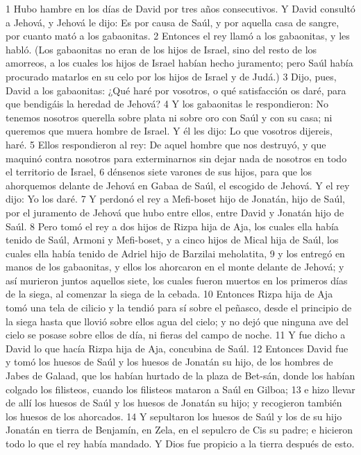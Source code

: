 1 Hubo hambre en los días de David por tres años consecutivos. Y David consultó a Jehová, y Jehová le dijo: Es por causa de Saúl, y por aquella casa de sangre, por cuanto mató a los gabaonitas.
2 Entonces el rey llamó a los gabaonitas, y les habló. (Los gabaonitas no eran de los hijos de Israel, sino del resto de los amorreos, a los cuales los hijos de Israel habían hecho juramento; pero Saúl había procurado matarlos en su celo por los hijos de Israel y de Judá.)
3 Dijo, pues, David a los gabaonitas: ¿Qué haré por vosotros, o qué satisfacción os daré, para que bendigáis la heredad de Jehová?
4 Y los gabaonitas le respondieron: No tenemos nosotros querella sobre plata ni sobre oro con Saúl y con su casa; ni queremos que muera hombre de Israel. Y él les dijo: Lo que vosotros dijereis, haré.
5 Ellos respondieron al rey: De aquel hombre que nos destruyó, y que maquinó contra nosotros para exterminarnos sin dejar nada de nosotros en todo el territorio de Israel,
6 dénsenos siete varones de sus hijos, para que los ahorquemos delante de Jehová en Gabaa de Saúl, el escogido de Jehová. Y el rey dijo: Yo los daré.
7 Y perdonó el rey a Mefi-boset hijo de Jonatán, hijo de Saúl, por el juramento de Jehová que hubo entre ellos, entre David y Jonatán hijo de Saúl. 
8 Pero tomó el rey a dos hijos de Rizpa hija de Aja, los cuales ella había tenido de Saúl, Armoni y Mefi-boset, y a cinco hijos de Mical hija de Saúl, los cuales ella había tenido de Adriel hijo de Barzilai meholatita, 
9 y los entregó en manos de los gabaonitas, y ellos los ahorcaron en el monte delante de Jehová; y así murieron juntos aquellos siete, los cuales fueron muertos en los primeros días de la siega, al comenzar la siega de la cebada.
10 Entonces Rizpa hija de Aja tomó una tela de cilicio y la tendió para sí sobre el peñasco, desde el principio de la siega hasta que llovió sobre ellos agua del cielo; y no dejó que ninguna ave del cielo se posase sobre ellos de día, ni fieras del campo de noche.
11 Y fue dicho a David lo que hacía Rizpa hija de Aja, concubina de Saúl.
12 Entonces David fue y tomó los huesos de Saúl y los huesos de Jonatán su hijo, de los hombres de Jabes de Galaad, que los habían hurtado de la plaza de Bet-sán, donde los habían colgado los filisteos, cuando los filisteos mataron a Saúl en Gilboa; 
13 e hizo llevar de allí los huesos de Saúl y los huesos de Jonatán su hijo; y recogieron también los huesos de los ahorcados.
14 Y sepultaron los huesos de Saúl y los de su hijo Jonatán en tierra de Benjamín, en Zela, en el sepulcro de Cis su padre; e hicieron todo lo que el rey había mandado. Y Dios fue propicio a la tierra después de esto.


